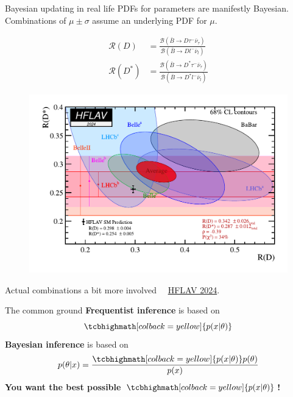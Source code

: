 \documentclass[
aspectratio=169,
14pt,
professionalfonts
]{beamer}
\newcommand{\arrow}{~\ding{220}~}
\begin{document}
\begin{frame}{Bayesian updating in real life}
    \vspace{-0.5cm}
    PDFs for parameters are manifestly Bayesian.\\
    Combinations of $\mu \pm \sigma$ assume an underlying PDF for $\mu$.
    \begin{minipage}{0.44\textwidth}
        \begin{align*}
            \mathcal{R}(D) &= \frac{
                \mathcal{B}(\bar B \to D \tau^- \bar{\nu}_\tau)
            }{
                \mathcal{B}(\bar B \to D l^- \bar{\nu}_l)
            }\\
            \mathcal{R}(D^*) &= \frac{
                \mathcal{B}(\bar B \to D^* \tau^- \bar{\nu}_\tau)
            }{
                \mathcal{B}(\bar B \to D^* l^- \bar{\nu}_l)
            }
        \end{align*}
    \end{minipage}
    \begin{minipage}{0.55\textwidth}
        \begin{figure}
            \centering
            \includegraphics[width=\textwidth]{../plots/rd_rdstar.pdf}
        \end{figure}
    \end{minipage}
    \small Actual combinations a bit more involved \arrow \href{https://arxiv.org/pdf/2411.18639}{HFLAV 2024}.
\end{frame}

\begin{frame}{The common ground}
    \textbf{Frequentist inference} is based on 
    $$\tcbhighmath[colback=yellow]{p(x|\theta)}$$
    \textbf{Bayesian inference} is based on
    $$p(\theta | x) = \frac{\tcbhighmath[colback=yellow]{p(x|\theta)} p(\theta)}{p(x)}$$
    \centering
    \Large
    \textbf{You want the best possible $\tcbhighmath[colback=yellow]{p(x|\theta)}$!}
\end{frame}
\end{document}
